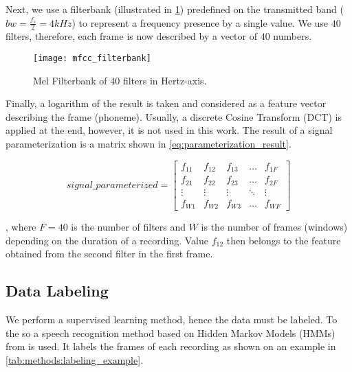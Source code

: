 \begin{enumerate}
Next, we use a filterbank (illustrated in \cref{fig:methods:mfcc_filterbank}) predefined on the transmitted band ($ bw = \frac{f_s}{2} = 4kHz $) to represent a frequency presence by a single value. We use $ 40 $ filters, therefore, each frame is now described by a vector of $ 40 $ numbers.

\begin{figure}[H]
\centering
\texttt{[image: mfcc\_filterbank]}
\caption{Mel Filterbank of 40 filters in Hertz-axis.}
\label{fig:methods:mfcc_filterbank}
\end{figure}

Finally, a logarithm of the result is taken and considered as a feature vector describing the frame (phoneme). Usually, a discrete Cosine Transform (DCT) is applied at the end, however, it is not used in this work. The result of a signal parameterization is a matrix shown in \cref{eq:parameterization_result}.

\begin{equation} \label{eq:parameterization_result}
signal\_parameterized = 
\begin{bmatrix}
    f_{11} & f_{12} & f_{13} & \dots  & f_{1F} \\
    f_{21} & f_{22} & f_{23} & \dots  & f_{2F} \\
    \vdots & \vdots & \vdots & \ddots & \vdots \\
    f_{W1} & f_{W2} & f_{W3} & \dots  & f_{WF}
\end{bmatrix}
\end{equation}

, where $ F = 40 $ is the number of filters and $ W $ is the number of frames (windows) depending on the duration of a recording. Value $ f_{12} $ then belongs to the feature obtained from the second filter in the first frame.
\end{enumerate}

\subsection*{Data Labeling}
We perform a supervised learning method, hence the data must be labeled. To the so a speech recognition method based on Hidden Markov Models (HMMs) from \citep{smidl_pc} is used. It labels the frames of each recording as shown on an example in \cref{tab:methods:labeling_example}.

